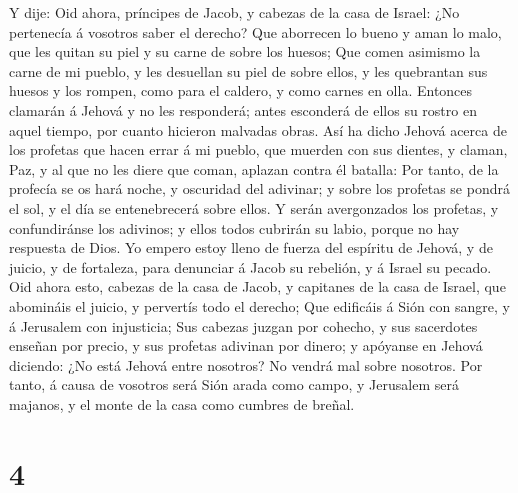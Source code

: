  Y dije: Oid ahora, príncipes de Jacob, y cabezas de la
casa de Israel: ¿No pertenecía á vosotros saber el derecho?
 Que aborrecen lo bueno y aman lo malo, que les quitan su
piel y su carne de sobre los huesos;  Que comen asimismo
la carne de mi pueblo, y les desuellan su piel de sobre ellos, y les
quebrantan sus huesos y los rompen, como para el caldero, y como carnes
en olla.  Entonces clamarán á Jehová y no les responderá;
antes esconderá de ellos su rostro en aquel tiempo, por cuanto hicieron
malvadas obras.  Así ha dicho Jehová acerca de los
profetas que hacen errar á mi pueblo, que muerden con sus dientes, y
claman, Paz, y al que no les diere que coman, aplazan contra él batalla:
 Por tanto, de la profecía se os hará noche, y oscuridad
del adivinar; y sobre los profetas se pondrá el sol, y el día se
entenebrecerá sobre ellos.  Y serán avergonzados los
profetas, y confundiránse los adivinos; y ellos todos cubrirán su labio,
porque no hay respuesta de Dios.  Yo empero estoy lleno de
fuerza del espíritu de Jehová, y de juicio, y de fortaleza, para
denunciar á Jacob su rebelión, y á Israel su pecado.  Oid
ahora esto, cabezas de la casa de Jacob, y capitanes de la casa de
Israel, que abomináis el juicio, y pervertís todo el derecho;
 Que edificáis á Sión con sangre, y á Jerusalem con
injusticia;  Sus cabezas juzgan por cohecho, y sus
sacerdotes enseñan por precio, y sus profetas adivinan por dinero; y
apóyanse en Jehová diciendo: ¿No está Jehová entre nosotros? No vendrá
mal sobre nosotros.  Por tanto, á causa de vosotros será
Sión arada como campo, y Jerusalem será majanos, y el monte de la casa
como cumbres de breñal.

\hypertarget{section-3}{%
\section{4}\label{section-3}}

